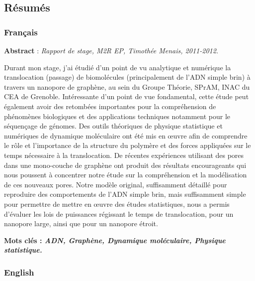 \documentclass[a4paper,11pt]{article}
\begin{document}
\newpage

\subsection*{Résumés}

\subsubsection*{Français}

\parbox{15cm}{\small
\textbf{Abstract} : \it Rapport de stage, M2R EP, Timothée Menais, 2011-2012.

\vspace{0.5cm}
\rm Durant mon stage, j'ai étudié d'un point de vu analytique et numérique la translocation (passage) de biomolécules (principalement de l'ADN simple brin) à travers un nanopore de graphène, au sein du Groupe Théorie, SPrAM, INAC du CEA de Grenoble. Intéressante d'un point de vue fondamental, cette étude peut également avoir des retombées importantes pour la compréhension de phénomènes biologiques et des applications techniques notamment pour le séquençage de génomes. Des outils théoriques de physique statistique et numériques de dynamique moléculaire ont été mis en œuvre afin de comprendre le rôle et l'importance de la structure du polymère et des forces appliquées sur le temps nécessaire à la translocation. De récentes expériences utilisant des pores dans une mono-couche de graphène ont produit des résultats encourageants qui nous poussent à concentrer notre étude sur la compréhension et la modélisation de ces nouveaux pores. Notre modèle original, suffisamment détaillé pour reproduire des comportements de l'ADN simple brin, mais suffisamment simple pour permettre de mettre en œuvre des études statistiques, nous a permis d'évaluer les lois de puissances régissant le temps de translocation, pour un nanopore large, ainsi que pour un nanopore étroit.
} %


\vspace{0.5cm}

\parbox{15cm}{
\textbf{Mots clés : \it ADN, Graphène, Dynamique moléculaire, Physique statistique.} }


\subsubsection*{English}

\end{document}
